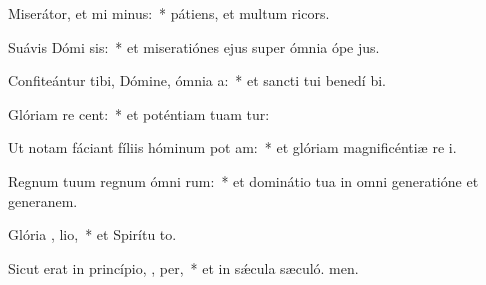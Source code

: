 \item Miserátor, et mi minus:~* pátiens, et multum ricors.
\item Suávis Dómi sis:~* et miseratiónes ejus super ómnia ópe jus.
\item Confiteántur tibi, Dómine, ómnia  a:~* et sancti tui benedí bi.
\item Glóriam re  cent:~* et poténtiam tuam tur:
\item Ut notam fáciant fíliis hóminum pot am:~* et glóriam magnificéntiæ re i.
\item Regnum tuum regnum ómni rum:~* et dominátio tua in omni generatióne et generanem.
\item Glória ,  lio,~* et Spirítu to.
\item Sicut erat in princípio,  ,  per,~* et in sǽcula sæculó. men.
